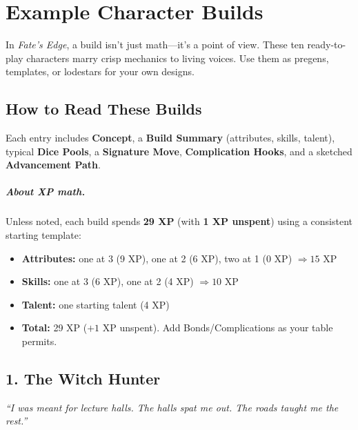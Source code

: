 
\chapter{Example Character Builds}
\label{ch:example-builds}

\begin{multicols}{2}

In \textit{Fate’s Edge}, a build isn’t just math—it’s a point of view. These ten ready-to-play characters marry crisp mechanics to living voices. Use them as pregens, templates, or lodestars for your own designs.

\section*{How to Read These Builds}
Each entry includes \textbf{Concept}, a \textbf{Build Summary} (attributes, skills, talent), typical \textbf{Dice Pools}, a \textbf{Signature Move}, \textbf{Complication Hooks}, and a sketched \textbf{Advancement Path}.

\paragraph{About XP math.} Unless noted, each build spends \textbf{29 XP} (with \textbf{1 XP unspent}) using a consistent starting template:
\begin{itemize}
  \item \textbf{Attributes:} one at 3 (9 XP), one at 2 (6 XP), two at 1 (0 XP) \(\Rightarrow 15\) XP
  \item \textbf{Skills:} one at 3 (6 XP), one at 2 (4 XP) \(\Rightarrow 10\) XP
  \item \textbf{Talent:} one starting talent (4 XP)
  \item \textbf{Total:} 29 XP (\( +1\) XP unspent). Add Bonds/Complications as your table permits.
\end{itemize}

\section{1. The Witch Hunter}
\textit{“I was meant for lecture halls. The halls spat me out. The roads taught me the rest.”}


\end{multicols}
